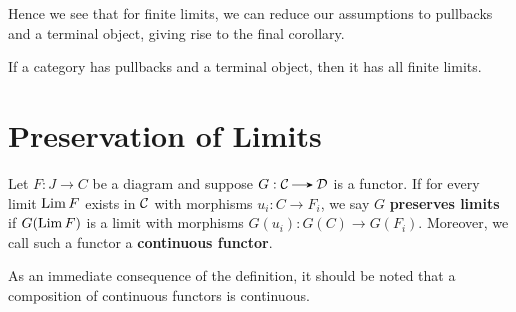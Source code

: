     \begin{center}
    \end{center}

    Hence we see that for finite limits, we can reduce our assumptions to pullbacks and 
    a terminal object, giving rise to the final corollary. 
    \begin{thm}
        If a category has pullbacks and a terminal object, then it has all finite limits. 
    \end{thm}

    \newpage
    \section{Preservation of Limits}
   
    \begin{definition}
        Let $F: J \to C$ be a diagram and suppose 
        $G: \cc \to \dd$ is a functor. If for every limit
        $\operatorname*{\mathrm{Lim }} F$ exists in $\mathcal{C}$ with morphisms $u_i: C \to F_i$,
        we say $G$ \textbf{preserves limits} if 
        $G(\operatorname*{\mathrm{Lim }} F)$ is 
        a limit with morphisms $G(u_i): G(C) \to G(F_i)$. Moreover, 
        we call such a functor a \textbf{continuous functor}.
    \end{definition}

    As an immediate consequence of the definition, it should be noted 
    that a composition of continuous functors is continuous. 

